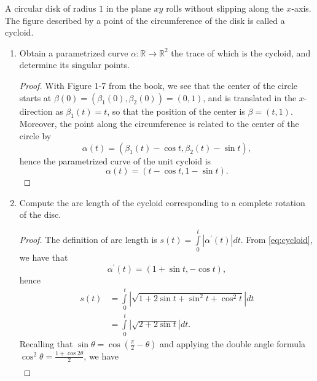 \documentclass[12pt]{article}
\newenvironment{problem}[2][Problem]{\begin{trivlist}
    \item[\hskip \labelsep {\bfseries #1}\hskip \labelsep {\bfseries #2.}]}{\end{trivlist}}
\theoremstyle{definition}
\begin{document}
\begin{problem}{1.3.2}
	A circular disk of radius \( 1 \) in the plane \( xy \) rolls without slipping along the \( x \)-axis. The figure described by a point of the circumference of the disk is called a cycloid.
	\begin{enumerate}[label=(\alph*)]
		\item Obtain a parametrized curve \(\alpha: \mathbb{R} \rightarrow \mathbb{R}^2\) the trace of which is the cycloid, and determine its singular points.
		      \begin{proof}
			      With Figure 1-7 from the book, we see that the center of the circle starts at \( \beta(0) = (\beta_1(0), \beta_{2}(0)) = (0, 1) \), and is translated in the \( x \)-direction as \( \beta_1(t)=t \), so that the position of the center is \(\beta = (t, 1)\).
			      Moreover, the point along the circumference is related to the center of the circle by
			      \begin{equation}
				      \alpha(t)=(\beta_1(t) - \cos t, \beta_2(t) - \sin t),
			      \end{equation}
			      hence the parametrized curve of the unit cycloid is
			      \begin{equation}
				      \label{eq:cycloid}
				      \alpha(t)=(t - \cos t, 1 - \sin t).
			      \end{equation}
		      \end{proof}
		\item Compute the arc length of the cycloid corresponding to a complete rotation of the disc.
		      \begin{proof}
			      The definition of arc length is \( s(t) = \int\limits_0^t \left| \alpha^{\prime}(t) \right| dt\).
			      From \cref{eq:cycloid}, we have that
			      \begin{equation}
				      \label{eq:8}
				      \alpha^{\prime}(t) = (1 + \sin t, -\cos t),
			      \end{equation}
			      hence
			      \begin{align}
				      \label{eq:9}
				      s(t) & = \int\limits_0^t \left| \sqrt{1 + 2\sin t + \sin^2 t + \cos^2 t} \right| dt \\
				           & = \int\limits_0^t \left| \sqrt{2 + 2\sin t} \right| dt.
			      \end{align}
			      Recalling that \( \sin\theta = \cos(\frac{\pi}{2} - \theta) \) and applying the double angle formula \( \cos^2\theta = \frac{1+\cos2\theta}{2} \), we have
			      \begin{align}

\end{align}
\end{proof}
\end{enumerate}
\end{problem}
\end{document}
